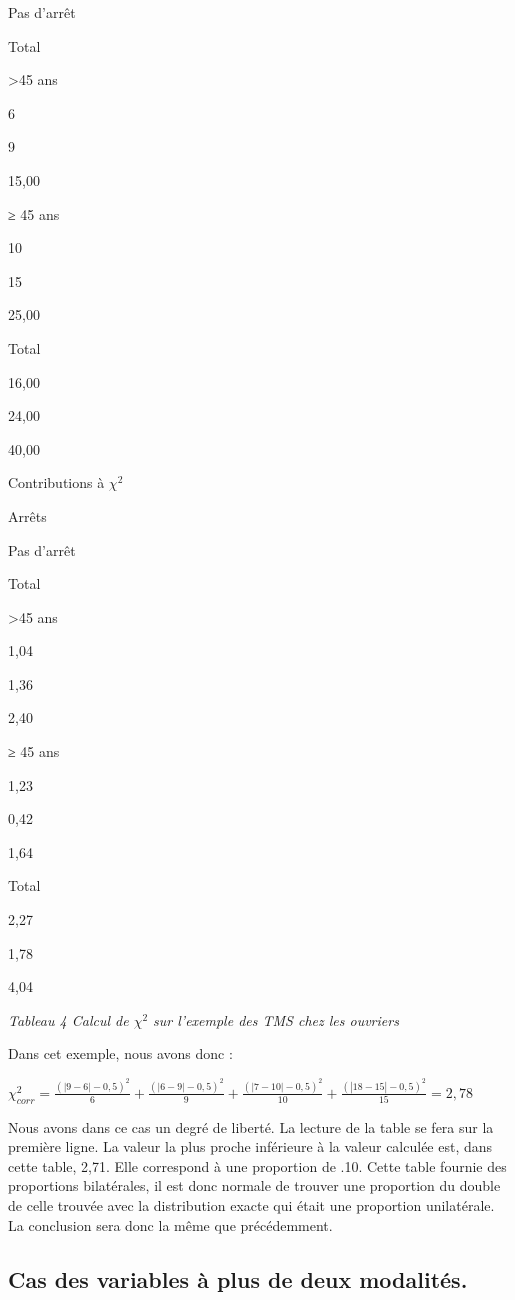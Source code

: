 \documentclass[]{book}
\theoremstyle{definition}
\theoremstyle{definition}
\theoremstyle{definition}
\theoremstyle{remark}
\begin{document}
Pas d'arrêt

Total

\textgreater{}45 ans

6

9

15,00

≥ 45 ans

10

15

25,00

Total

16,00

24,00

40,00

Contributions à \(\chi^{2}\)

Arrêts

Pas d'arrêt

Total

\textgreater{}45 ans

1,04

1,36

2,40

≥ 45 ans

1,23

0,42

1,64

Total

2,27

1,78

4,04

\emph{Tableau 4 Calcul de \(\chi ^{2}\) sur l'exemple des TMS chez les
ouvriers}

Dans cet exemple, nous avons donc :

\(\chi ^{2}_{corr} = \frac{\left ( \left | 9-6 \right | -0,5 \right )^{2}}{6}+\frac{\left ( \left | 6-9 \right | -0,5 \right )^{2}}{9} + \frac{\left ( \left | 7-10 \right | -0,5 \right )^{2}}{10} +\frac{\left ( \left | 18-15 \right | -0,5 \right )^{2}}{15} = 2,78\)

Nous avons dans ce cas un degré de liberté. La lecture de la table se
fera sur la première ligne. La valeur la plus proche inférieure à la
valeur calculée est, dans cette table, 2,71. Elle correspond à une
proportion de .10. Cette table fournie des proportions bilatérales, il
est donc normale de trouver une proportion du double de celle trouvée
avec la distribution exacte qui était une proportion unilatérale. La
conclusion sera donc la même que précédemment.

\hypertarget{cas-des-variables-a-plus-de-deux-modalites.}{%
\subsection{Cas des variables à plus de deux
modalités.}\label{cas-des-variables-a-plus-de-deux-modalites.}}
\end{document}
